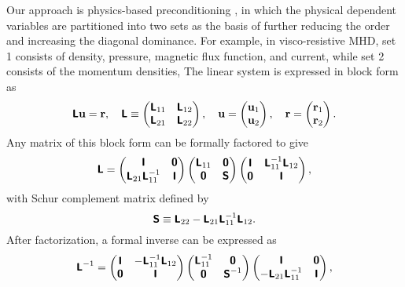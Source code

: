 \documentclass{report}
\begin{document}
Our approach is physics-based preconditioning \cite{Cha08}, in which the
physical dependent variables are partitioned into two sets as the basis
of further reducing the order and increasing the diagonal dominance.
For example, in visco-resistive MHD, set 1 consists of density,
pressure, magnetic flux function, and current, while set 2 consists of
the momentum densities, The linear system is expressed in block form as
\begin{equation}
\t{L} \v{u} = \v{r}, \quad
\t{L} \equiv \left( \begin{matrix} \t{L}_{11} & \t{L}_{12} \\
\t{L}_{21} & \t{L}_{22} \end{matrix} \right), \quad
\v{u} = \left( \begin{matrix} \v{u}_1 \\ \v{u}_2 \end{matrix} \right), \quad
\v{r} = \left( \begin{matrix} \v{r}_1 \\ \v{r}_2 \end{matrix} \right).
\end{equation}
Any matrix of this block form can be formally factored to give
\begin{equation}
\t{L} = \left( \begin{matrix} \t{I} & \t{0} \\
\t{L}_{21} \t{L}_{11}^{-1} & \t{I} \end{matrix} \right)
\left( \begin{matrix} \t{L}_{11} & \t{0} \\ \t{0} & \t{S} \end{matrix} \right)
\left( \begin{matrix} \t{I} & \t{L}_{11}^{-1} \t{L}_{12}
\\ \t{0} & \t{I} \end{matrix} \right),
\end{equation}
with Schur complement matrix defined by
\begin{equation}
\t{S} \equiv \t{L}_{22} - \t{L}_{21} \t{L}_{11}^{-1} \t{L}_{12}.
\label{eq:schur}
\end{equation}
After factorization, a formal inverse can be expressed as
\begin{equation}
\t{L}^{-1} = \left( \begin{matrix} \t{I} & - \t{L}_{11}^{-1} \t{L}_{12} \\
\t{0} & \t{I} \end{matrix} \right)
\left( \begin{matrix} \t{L}_{11}^{-1} & \t{0} \\ \t{0} & \t{S}^{-1}
\end{matrix} \right)
\left( \begin{matrix} \t{I} & \t{0} \\
- \t{L}_{21} \t{L}_{11}^{-1} & \t{I} \end{matrix} \right),
\end{equation}
\end{document}
